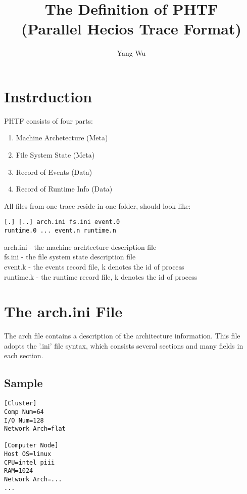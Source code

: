 \documentclass{article}
\title{The Definition of PHTF \\(Parallel Hecios Trace Format)}
\author{Yang Wu}
\begin{document}
\maketitle

\section{Instrduction}
\label{sec:Instrduction}

PHTF consists of four parts:
\begin{enumerate}
\item Machine Archetecture (Meta)
\item File System State (Meta)
\item Record of Events (Data)
\item Record of Runtime Info (Data)
\end{enumerate}

All files from one trace reside in one folder, should look like:
\begin{verbatim}
[.] [..] arch.ini fs.ini event.0 
runtime.0 ... event.n runtime.n
\end{verbatim}

\begin{description}
\item[arch.ini - the machine archtecture description file] 
\item[fs.ini - the file system state description file]
\item[event.k - the events record file, k denotes the id of process]
\item[runtime.k - the runtime record file, k denotes the id of process]
\end{description}

\section{The arch.ini File}
\label{sec:TheArchIniFile}

The arch file contains a description of the architecture information. This file adopts the '.ini' file syntax, which consists several sections and many fields in each section.

\subsection{Sample}
\label{sec:SampleArch}
\begin{verbatim}
[Cluster]
Comp Num=64
I/O Num=128
Network Arch=flat

[Computer Node]
Host OS=linux
CPU=intel piii
RAM=1024
Network Arch=...
...
\end{verbatim}
\end{document}
